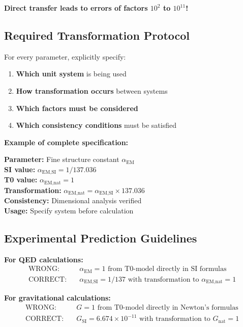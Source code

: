 \documentclass[12pt,a4paper]{article}
\newcommand{\alphaEMSI}{\alpha_{\text{EM,SI}}}
\newcommand{\alphaEMnat}{\alpha_{\text{EM,nat}}}
\begin{document}
	\textbf{Direct transfer leads to errors of factors $10^2$ to $10^{11}$!}
	
	\subsection{Required Transformation Protocol}
	\label{subsec:transformation_protocol}
	
	For every parameter, explicitly specify:
	
	\begin{enumerate}
		\item \textbf{Which unit system} is being used
		\item \textbf{How transformation occurs} between systems
		\item \textbf{Which factors must be considered}
		\item \textbf{Which consistency conditions} must be satisfied
	\end{enumerate}
	
	\textbf{Example of complete specification:}
	\begin{tcolorbox}[colback=red!5!white,colframe=red!75!black,title=Parameter Specification Template]
		\textbf{Parameter:} Fine structure constant $\alpha_{\text{EM}}$ \\
		\textbf{SI value:} $\alphaEMSI = 1/137.036$ \\
		\textbf{T0 value:} $\alphaEMnat = 1$ \\
		\textbf{Transformation:} $\alphaEMnat = \alphaEMSI \times 137.036$ \\
		\textbf{Consistency:} Dimensional analysis verified \\
		\textbf{Usage:} Specify system before calculation
	\end{tcolorbox}
	
	\subsection{Experimental Prediction Guidelines}
	\label{subsec:experimental_guidelines}
	
	\textbf{For QED calculations:}
	\begin{align}
		\text{WRONG:} \quad &\alpha_{\text{EM}} = 1 \text{ from T0-model directly in SI formulas} \\
		\text{CORRECT:} \quad &\alphaEMSI = 1/137 \text{ with transformation to } \alphaEMnat = 1
	\end{align}
	
	\textbf{For gravitational calculations:}
	\begin{align}
		\text{WRONG:} \quad &G = 1 \text{ from T0-model directly in Newton's formulas} \\
		\text{CORRECT:} \quad &G_{\text{SI}} = 6.674 \times 10^{-11} \text{ with transformation to } G_{\text{nat}} = 1
	\end{align}
	
\end{document}
